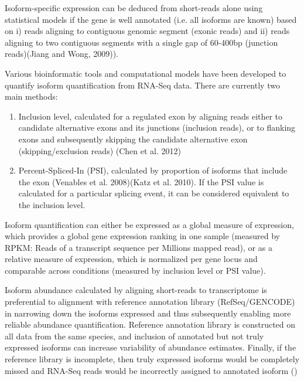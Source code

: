 Isoform-specific expression can be deduced from short-reads alone using statistical models if the gene is well annotated (i.e. all isoforms are known) based on i) reads aligning to contiguous genomic segment (exonic reads) and ii) reads aligning to two contiguous segments with a single gap of 60-400bp (junction reads)(Jiang and Wong, 2009)).

Various bioinformatic tools and computational models have been developed to quantify isoform quantification from RNA-Seq data. There are currently two main methods:
\begin{enumerate}
	\item Inclusion level, calculated for a regulated exon by aligning reads either to candidate alternative exons and its junctions (inclusion reads), or to flanking exons and subsequently skipping the candidate alternative exon (skipping/exclusion reads) (Chen et al. 2012)
	\item Percent-Spliced-In (PSI), calculated by proportion of isoforms that include the exon (Venables et al. 2008)(Katz et al. 2010). If the PSI value is calculated for a particular splicing event, it can be considered equivalent to the inclusion level. 
\end{enumerate}
Isoform quantification can either be expressed as a global measure of expression, which provides a global gene expression ranking in one sample (measured by RPKM: Reads of a transcript sequence per Millions mapped read), or as a relative measure of expression, which is normalized per gene locus and comparable across conditions (measured by inclusion level or PSI value). 

Isoform abundance calculated by aligning short-reads to transcriptome is preferential to alignment with reference annotation library (RefSeq/GENCODE) in narrowing down the isoforms expressed and thus subsequently enabling more reliable abundance quantification. Reference annotation library is constructed on all data from the same species, and inclusion of annotated but not truly expressed isoforms can increase variability of abundance estimates. Finally, if the reference library is incomplete, then truly expressed isoforms would be completely missed and RNA-Seq reads would be incorrectly assigned to annotated isoform (\cite{Au2013})


